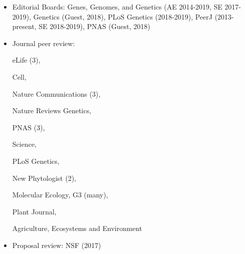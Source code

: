 \begin{itemize}
\item Editorial Boards: Genes, Genomes, and Genetics (AE 2014-2019, SE 2017-2019), Genetics (Guest, 2018), PLoS Genetics (2018-2019), PeerJ (2013-present, SE 2018-2019), PNAS (Guest, 2018)
\item Journal peer review:   eLife (3),   Cell,  Nature Communications (3),  Nature Reviews Genetics,  PNAS (3),    Science,  PLoS Genetics,  New Phytologist (2),   Molecular Ecology, G3 (many),   Plant Journal,   Agriculture, Ecosystems and Environment
\item Proposal review: NSF (2017)
\end{itemize}


